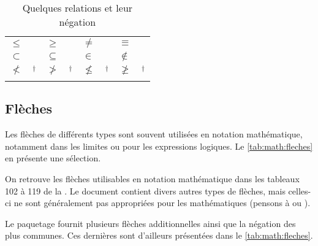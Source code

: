 \begin{table}[p]
  \caption{Quelques relations et leur négation}
  \label{tab:math:relations}
  \begin{tabularx}{1.0\linewidth}{lXlXlXlX}
    $\leq$      & \cmd{\leq} &
    $\geq$      & \cmd{\geq}   &
    $\neq$      & \cmd{\neq}    &
    $\equiv$    & \cmd{\equiv}    \\
    $\subset$   & \cmd{\subset} &
    $\subseteq$ & \cmd{\subseteq}  &
    $\in$       & \cmd{\in} &
    $\notin$    & \cmd{\notin} \\
    $\nless$    & \cmd{\nless}$^\dagger$ &
    $\ngtr$     & \cmd{\ngtr}$^\dagger$   &
    $\nleq$     & \cmd{\nleq}$^\dagger$    &
    $\ngeq$     & \cmd{\ngeq}$^\dagger$ \\
    \addlinespace
  \end{tabularx}
\end{table}

\subsection{Flèches}
\label{sec:math:symboles:fleches}

Les flèches de différents types sont souvent utilisées en notation
mathématique, notamment dans les limites ou pour les expressions
logiques. Le \autoref{tab:math:fleches} en présente une sélection.

On retrouve les flèches utilisables en notation mathématique dans les
tableaux 102 à 119 de la %
. %
Le document contient divers autres types de flèches, mais celles-ci ne
sont généralement pas appropriées pour les mathématiques (pensons à
{\manerrarrow} ou {\faArrowRight}).

Le paquetage  fournit plusieurs flèches additionnelles
ainsi que la négation des plus communes. Ces dernières sont d'ailleurs
présentées dans le \autoref{tab:math:fleches}.

